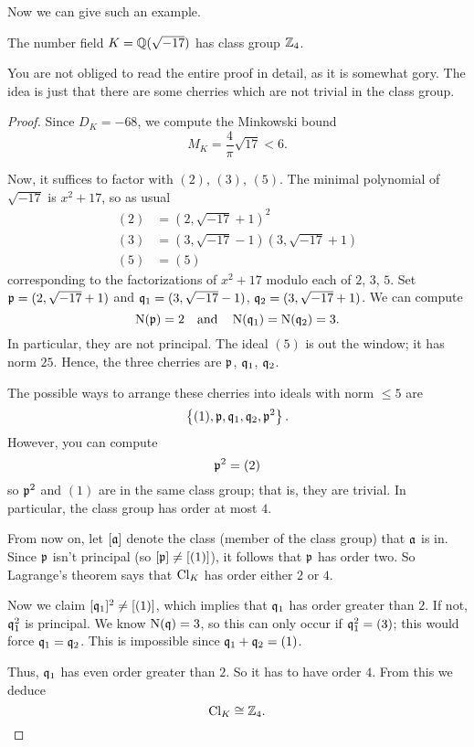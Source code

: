 Now we can give such an example.
\begin{proposition}
	The number field $K = \QQ(\sqrt{-17})$ has class group $\Zc 4$.
\end{proposition}
You are not obliged to read the entire proof in detail,
as it is somewhat gory.
The idea is just that there are some cherries which are not trivial in the class group.
\begin{proof}
Since $D_K = -68$, we compute
the Minkowski bound
\[ M_K = \frac{4}{\pi} \sqrt{17} < 6. \]

Now, it suffices to factor with $(2)$, $(3)$, $(5)$.
The minimal polynomial of $\sqrt{-17}$ is $x^2+17$, so as usual
\begin{align*}
	(2) &= (2, \sqrt{-17}+1)^2 \\
	(3) &= (3, \sqrt{-17}-1)(3,\sqrt{-17}+1) \\
	(5) &= (5)
\end{align*}
corresponding to the factorizations of $x^2+17$ modulo each of $2$, $3$, $5$.
Set $\pp = (2, \sqrt{-17}+1)$ and $\qq_1 = (3, \sqrt{-17}-1)$, $\qq_2 = (3, \sqrt{-17}+1)$.
We can compute
\[ \Norm(\pp) = 2 \quad\text{and}\quad \Norm(\qq_1) = \Norm(\qq_2) = 3. \]
In particular, they are not principal.
The ideal $(5)$ is out the window; it has norm $25$.
Hence, the three cherries are $\pp$, $\qq_1$, $\qq_2$.

The possible ways to arrange these cherries into ideals with norm $\le 5$ are
\[ \left\{ (1), \pp, \qq_1, \qq_2, \pp^2 \right\}. \]
However, you can compute \[ \pp^2 = (2) \] so $\pp^2$ and $(1)$ are in the same class group;
that is, they are trivial.
In particular, the class group has order at most $4$.

From now on, let $[\aa]$ denote the class (member of the class group) that $\aa$ is in.
Since $\pp$ isn't principal (so $[\pp] \neq [(1)]$), it follows that $\pp$ has order two.
So Lagrange's theorem says that $\Cl_K$ has order either $2$ or $4$.

Now we claim $[\qq_1]^2 \neq [(1)]$, which implies that $\qq_1$ has order greater than $2$.
If not, $\qq_1^2$ is principal.
We know $\Norm(\qq) = 3$,
so this can only occur if $\qq_1^2 = (3)$;
this would force $\qq_1 = \qq_2$.
This is impossible since $\qq_1 + \qq_2 = (1)$.

Thus, $\qq_1$ has even order greater than $2$.
So it has to have order $4$.
From this we deduce \[ \Cl_K \cong \Zc 4. \qedhere \]
\end{proof}




